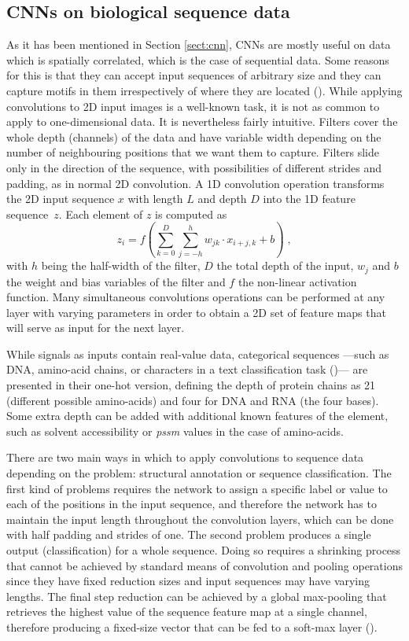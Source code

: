 \subsection{CNNs on biological sequence data}
As it has been mentioned in Section \ref{sect:cnn}, CNNs are mostly useful on data which is spatially correlated, which is the case of sequential data. Some reasons for this is that they can accept input sequences of arbitrary size and they can capture motifs in them irrespectively of where they are located (\cite{Jurtz2017}). While applying convolutions to 2D input images is a well-known task, it is not as common to apply to one-dimensional data. It is nevertheless fairly intuitive. Filters cover the whole depth (channels) of the data and have variable width depending on the number of neighbouring positions that we want them to capture. Filters slide only in the direction of the sequence, with possibilities of different strides and padding, as in normal 2D convolution. A 1D convolution operation transforms the 2D input sequence $x$ with length $L$ and depth $D$ into the 1D feature sequence~$z$. Each element of $z$ is computed as
\begin{equation}
z_i = f\left( \sum_{k=0}^{D} \sum_{j=-h}^{h} w_{jk} \cdot x_{i+j,k} + b \right) \; ,
\end{equation}
with $h$ being the half-width of the filter, $D$ the total depth of the input, $w_j$ and $b$ the weight and bias variables of the filter and $f$ the non-linear activation function. Many simultaneous convolutions operations can be performed at any layer with varying parameters in order to obtain a 2D set of feature maps that will serve as input for the next layer.

While signals as inputs contain real-value data, categorical sequences ---such as DNA, amino-acid chains, or characters in a text classification task (\cite{Zhang2015})--- are presented in their one-hot version, defining the depth of protein chains as 21 (different possible amino-acids) and four for DNA and RNA (the four bases). Some extra depth can be added with additional known features of the element, such as solvent accessibility or \textit{pssm} values in the case of amino-acids.

There are two main ways in which to apply convolutions to sequence data depending on the problem: structural annotation or sequence classification. The first kind of problems requires the network to assign a specific label or value to each of the positions in the input sequence, and therefore the network has to maintain the input length throughout the convolution layers, which can be done with half padding and strides of one. The second problem produces a single output (classification) for a whole sequence. Doing so requires a shrinking process that cannot be achieved by standard means of convolution and pooling operations since they have fixed reduction sizes and input sequences may have varying lengths. The final step reduction can be achieved by a global max-pooling that retrieves the highest value of the sequence feature map at a single channel, therefore producing a fixed-size vector that can be fed to a soft-max layer (\cite{Jurtz2017}).

